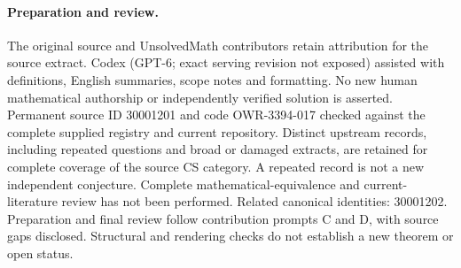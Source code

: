 \documentclass[11pt]{article}
\begin{document}
\paragraph{Preparation and review.}
The original source and UnsolvedMath contributors retain attribution for the source extract. Codex (GPT-6; exact serving revision not exposed) assisted with definitions, English summaries, scope notes and formatting. No new human mathematical authorship or independently verified solution is asserted. Permanent source ID 30001201 and code OWR-3394-017 checked against the complete supplied registry and current repository. Distinct upstream records, including repeated questions and broad or damaged extracts, are retained for complete coverage of the source CS category. A repeated record is not a new independent conjecture. Complete mathematical-equivalence and current-literature review has not been performed. Related canonical identities: 30001202. Preparation and final review follow contribution prompts C and D, with source gaps disclosed. Structural and rendering checks do not establish a new theorem or open status.
\label{end:30001201}
\end{document}

